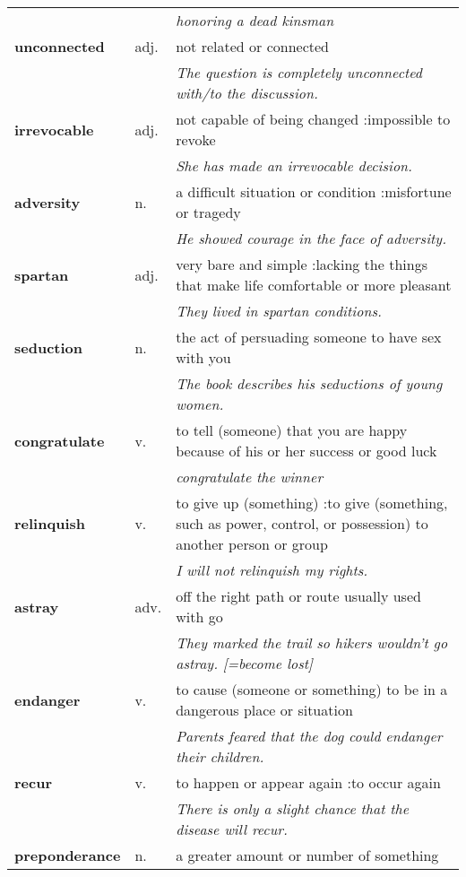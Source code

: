 \documentclass[a4paper]{article}
\begin{document}
\begin{longtable}{llp{11cm}}
 & & \textit{honoring a dead kinsman}\\[0.08cm]
\textbf{unconnected} & adj. &  not related or connected \\
 & & \textit{The question is completely unconnected with/to the discussion.}\\[0.08cm]
\textbf{irrevocable} & adj. &  not capable of being changed :impossible to revoke \\
 & & \textit{She has made an irrevocable decision.}\\[0.08cm]
\textbf{adversity} & n. &  a difficult situation or condition :misfortune or tragedy \\
 & & \textit{He showed courage in the face of adversity.}\\[0.08cm]
\textbf{spartan} & adj. &  very bare and simple :lacking the things that make life comfortable or more pleasant \\
 & & \textit{They lived in spartan conditions.}\\[0.08cm]
\textbf{seduction} & n. &  the act of persuading someone to have sex with you \\
 & & \textit{The book describes his seductions of young women.}\\[0.08cm]
\textbf{congratulate} & v. &  to tell (someone) that you are happy because of his or her success or good luck \\
 & & \textit{congratulate the winner}\\[0.08cm]
\textbf{relinquish} & v. &  to give up (something) :to give (something, such as power, control, or possession) to another person or group \\
 & & \textit{I will not relinquish my rights.}\\[0.08cm]
\textbf{astray} & adv. &  off the right path or route usually used with go \\
 & & \textit{They marked the trail so hikers wouldn't go astray. [=become lost]}\\[0.08cm]
\textbf{endanger} & v. &  to cause (someone or something) to be in a dangerous place or situation \\
 & & \textit{Parents feared that the dog could endanger their children.}\\[0.08cm]
\textbf{recur} & v. &  to happen or appear again :to occur again \\
 & & \textit{There is only a slight chance that the disease will recur.}\\[0.08cm]
\textbf{preponderance} & n. &  a greater amount or number of something \\

\end{longtable}
\end{document}

